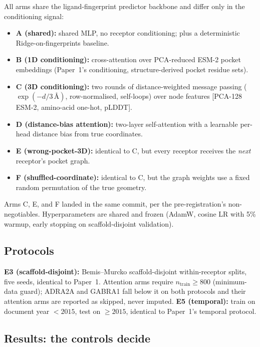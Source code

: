 \documentclass[11pt]{article}
\begin{document}
All arms share the ligand-fingerprint predictor backbone and differ only
in the conditioning signal:
\begin{itemize}[leftmargin=1.5em,itemsep=0pt]
  \item \textbf{A (shared):} shared MLP, no receptor conditioning;
        plus a deterministic Ridge-on-fingerprints baseline.
  \item \textbf{B (1D conditioning):} cross-attention over PCA-reduced
        ESM-2 pocket embeddings (Paper~1's conditioning, structure-derived
        pocket residue sets).
  \item \textbf{C (3D conditioning):} two rounds of distance-weighted
        message passing ($\exp(-d/3\,\text{\AA})$, row-normalised,
        self-loops) over node features [PCA-128 ESM-2, amino-acid one-hot,
        pLDDT].
  \item \textbf{D (distance-bias attention):} two-layer self-attention
        with a learnable per-head distance bias from true coordinates.
  \item \textbf{E (wrong-pocket-3D):} identical to C, but every receptor
        receives the \emph{next} receptor's pocket graph.
  \item \textbf{F (shuffled-coordinate):} identical to C, but the graph
        weights use a fixed random permutation of the true geometry.
\end{itemize}
Arms C, E, and F landed in the same commit, per the pre-registration's
non-negotiables. Hyperparameters are shared and frozen
(AdamW, cosine LR with 5\% warmup, early stopping on scaffold-disjoint
validation).

\subsection{Protocols}

\textbf{E3 (scaffold-disjoint):} Bemis--Murcko scaffold-disjoint
within-receptor splits, five seeds, identical to Paper~1. Attention arms
require $n_{\text{train}} \ge 800$ (minimum-data guard); ADRA2A and
GABRA1 fall below it on both protocols and their attention arms are
reported as skipped, never imputed. \textbf{E5 (temporal):} train on
document year $<2015$, test on $\ge 2015$, identical to Paper~1's
temporal protocol.

\subsection{Results: the controls decide}
\end{document}
